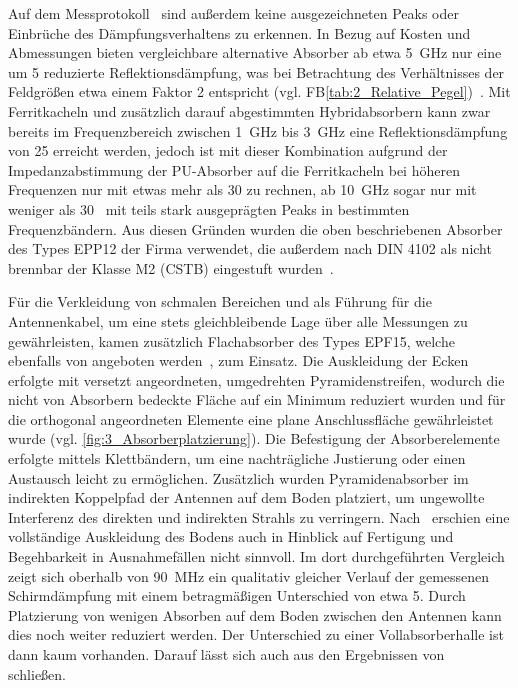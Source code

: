 Auf dem Messprotokoll~\cite{Eco_Messtechnik_Absorber} sind außerdem keine ausgezeichneten Peaks oder Einbrüche des Dämpfungsverhaltens zu erkennen. In Bezug auf Kosten und Abmessungen bieten vergleichbare alternative Absorber ab etwa \SI{5}{\giga\hertz} nur eine um \SI{5}{\Dezibel} reduzierte Reflektionsdämpfung, was bei Betrachtung des Verhältnisses der Feldgrößen etwa einem Faktor 2 entspricht (vgl. FB\Tabelle\ref{tab:2_Relative_Pegel})~\cite{Holland_Shielding_Absorber}. Mit Ferritkacheln und zusätzlich darauf abgestimmten Hybridabsorbern kann zwar bereits im Frequenzbereich zwischen \SI{1}{\giga\hertz} bis \SI{3}{\giga\hertz} eine Reflektionsdämpfung von \SI{25}{\Dezibel} erreicht werden, jedoch ist mit dieser Kombination aufgrund der Impedanzabstimmung der PU-Absorber auf die Ferritkacheln bei höheren Frequenzen nur mit etwas mehr als \SI{30}{\Dezibel} zu rechnen, ab \SI{10}{\giga\hertz} sogar nur mit weniger als \SI{30}{\Dezibel}~\cite{Holland_Shielding_Absorber} mit teils stark ausgeprägten Peaks in bestimmten Frequenzbändern. Aus diesen Gründen wurden die oben beschriebenen Absorber des Types EPP12 der Firma  verwendet, die außerdem nach DIN 4102 als nicht brennbar der Klasse M2 (CSTB) eingestuft wurden~\cite{Eco_Messtechnik_Absorber}. 
\par
\vspace{\linespace}
Für die Verkleidung von schmalen Bereichen und als Führung für die Antennenkabel, um eine stets gleichbleibende Lage über alle Messungen zu gewährleisten, kamen zusätzlich Flachabsorber des Types EPF15, welche ebenfalls von  angeboten werden~\cite{Eco_Messtechnik_Absorber}, zum Einsatz. Die Auskleidung der Ecken erfolgte mit versetzt angeordneten, umgedrehten Pyramidenstreifen, wodurch die nicht von Absorbern bedeckte Fläche auf ein Minimum reduziert wurden und für die orthogonal angeordneten Elemente eine plane Anschlussfläche gewährleistet wurde (vgl. \Abb\ref{fig:3_Absorberplatzierung}). Die Befestigung der Absorberelemente erfolgte mittels Klettbändern, um eine nachträgliche Justierung oder einen Austausch leicht zu ermöglichen. Zusätzlich wurden Pyramidenabsorber im indirekten Koppelpfad der Antennen auf dem Boden platziert, um ungewollte Interferenz des direkten und indirekten Strahls zu verringern. Nach~\cite{Vergleich_Absorberhalle_Groundplane} erschien eine vollständige Auskleidung des Bodens auch in Hinblick auf Fertigung und Begehbarkeit in Ausnahmefällen nicht sinnvoll. Im dort durchgeführten Vergleich zeigt sich oberhalb von \SI{90}{\mega\hertz} ein qualitativ gleicher Verlauf der gemessenen Schirmdämpfung mit einem betragmäßigen Unterschied von etwa \SI{5}{\Dezibel}. Durch Platzierung von wenigen Absorben auf dem Boden zwischen den Antennen kann dies noch weiter reduziert werden. Der Unterschied zu einer Vollabsorberhalle ist dann kaum vorhanden. Darauf lässt sich auch aus den Ergebnissen von~\cite{Optimierung_Feldhomogenitaet} schließen.
\par
\vspace{\linespace}

